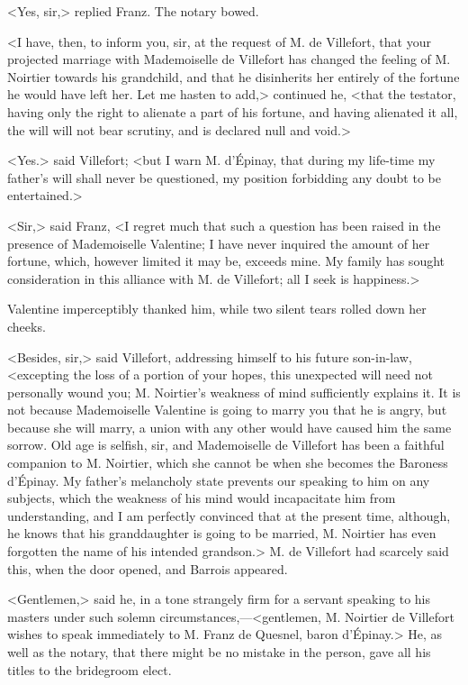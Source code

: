  <Yes, sir,> replied Franz. The notary bowed. 

 <I have, then, to inform you, sir, at the request of M. de Villefort, that your projected marriage with Mademoiselle de Villefort has changed the feeling of M. Noirtier towards his grandchild, and that he disinherits her entirely of the fortune he would have left her. Let me hasten to add,> continued he, <that the testator, having only the right to alienate a part of his fortune, and having alienated it all, the will will not bear scrutiny, and is declared null and void.> 

 <Yes.> said Villefort; <but I warn M. d'Épinay, that during my life-time my father's will shall never be questioned, my position forbidding any doubt to be entertained.>

<Sir,> said Franz, <I regret much that such a question has been raised in the presence of Mademoiselle Valentine; I have never inquired the amount of her fortune, which, however limited it may be, exceeds mine. My family has sought consideration in this alliance with M. de Villefort; all I seek is happiness.> 

 Valentine imperceptibly thanked him, while two silent tears rolled down her cheeks. 

 <Besides, sir,> said Villefort, addressing himself to his future son-in-law, <excepting the loss of a portion of your hopes, this unexpected will need not personally wound you; M. Noirtier's weakness of mind sufficiently explains it. It is not because Mademoiselle Valentine is going to marry you that he is angry, but because she will marry, a union with any other would have caused him the same sorrow. Old age is selfish, sir, and Mademoiselle de Villefort has been a faithful companion to M. Noirtier, which she cannot be when she becomes the Baroness d'Épinay. My father's melancholy state prevents our speaking to him on any subjects, which the weakness of his mind would incapacitate him from understanding, and I am perfectly convinced that at the present time, although, he knows that his granddaughter is going to be married, M. Noirtier has even forgotten the name of his intended grandson.> M. de Villefort had scarcely said this, when the door opened, and Barrois appeared. 

 <Gentlemen,> said he, in a tone strangely firm for a servant speaking to his masters under such solemn circumstances,—<gentlemen, M. Noirtier de Villefort wishes to speak immediately to M. Franz de Quesnel, baron d'Épinay.> He, as well as the notary, that there might be no mistake in the person, gave all his titles to the bridegroom elect. 

